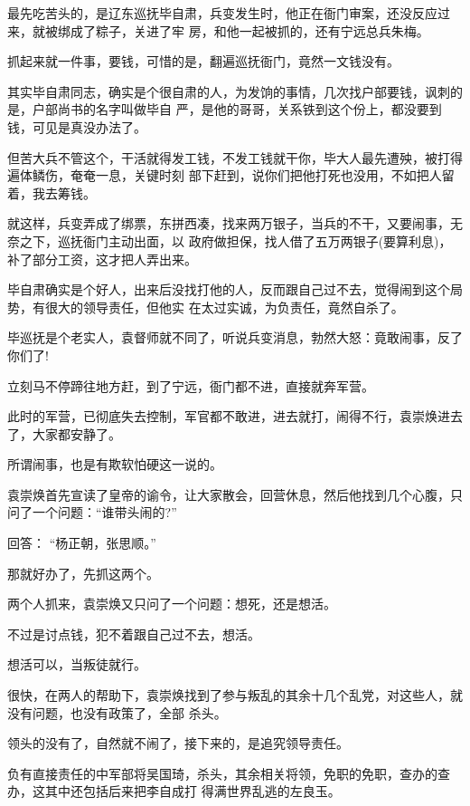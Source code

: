 \documentclass[11pt,a4paper,onecolumn]{article}
\begin{document}
最先吃苦头的，是辽东巡抚毕自肃，兵变发生时，他正在衙门审案，还没反应过来，就被绑成了粽子，关进了牢
房，和他一起被抓的，还有宁远总兵朱梅。

抓起来就一件事，要钱，可惜的是，翻遍巡抚衙门，竟然一文钱没有。

其实毕自肃同志，确实是个很自肃的人，为发饷的事情，几次找户部要钱，讽刺的是，户部尚书的名字叫做毕自
严，是他的哥哥，关系铁到这个份上，都没要到钱，可见是真没办法了。

但苦大兵不管这个，干活就得发工钱，不发工钱就干你，毕大人最先遭殃，被打得遍体鳞伤，奄奄一息，关键时刻
部下赶到，说你们把他打死也没用，不如把人留着，我去筹钱。

就这样，兵变弄成了绑票，东拼西凑，找来两万银子，当兵的不干，又要闹事，无奈之下，巡抚衙门主动出面，以
政府做担保，找人借了五万两银子(要算利息)，补了部分工资，这才把人弄出来。

毕自肃确实是个好人，出来后没找打他的人，反而跟自己过不去，觉得闹到这个局势，有很大的领导责任，但他实
在太过实诚，为负责任，竟然自杀了。

毕巡抚是个老实人，袁督师就不同了，听说兵变消息，勃然大怒：竟敢闹事，反了你们了!

立刻马不停蹄往地方赶，到了宁远，衙门都不进，直接就奔军营。

此时的军营，已彻底失去控制，军官都不敢进，进去就打，闹得不行，袁崇焕进去了，大家都安静了。

所谓闹事，也是有欺软怕硬这一说的。

袁崇焕首先宣读了皇帝的谕令，让大家散会，回营休息，然后他找到几个心腹，只问了一个问题：``谁带头闹的?''

回答： ``杨正朝，张思顺。''

那就好办了，先抓这两个。

两个人抓来，袁崇焕又只问了一个问题：想死，还是想活。

不过是讨点钱，犯不着跟自己过不去，想活。

想活可以，当叛徒就行。

很快，在两人的帮助下，袁崇焕找到了参与叛乱的其余十几个乱党，对这些人，就没有问题，也没有政策了，全部
杀头。

领头的没有了，自然就不闹了，接下来的，是追究领导责任。

负有直接责任的中军部将吴国琦，杀头，其余相关将领，免职的免职，查办的查办，这其中还包括后来把李自成打
得满世界乱逃的左良玉。

\section[\thesection]{}
\end{document}
